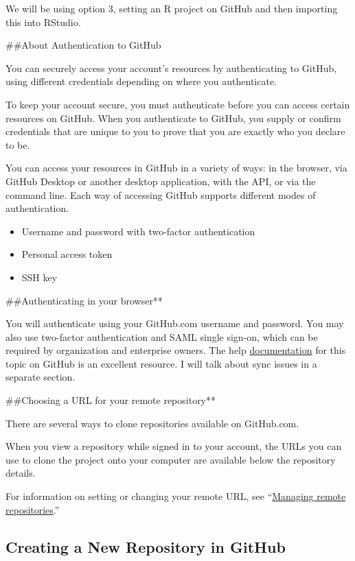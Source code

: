\documentclass[
]{article}
\begin{document}
We will be using option 3, setting an R project on GitHub and then
importing this into RStudio.

\#\#About Authentication to GitHub

You can securely access your account's resources by authenticating to
GitHub, using different credentials depending on where you authenticate.

To keep your account secure, you must authenticate before you can access
certain resources on GitHub. When you authenticate to GitHub, you supply
or confirm credentials that are unique to you to prove that you are
exactly who you declare to be.

You can access your resources in GitHub in a variety of ways: in the
browser, via GitHub Desktop or another desktop application, with the
API, or via the command line. Each way of accessing GitHub supports
different modes of authentication.

\begin{itemize}
\item
  Username and password with two-factor authentication
\item
  Personal access token
\item
  SSH key
\end{itemize}

\#\#Authenticating in your browser**

You will authenticate using your GitHub.com username and password. You
may also use two-factor authentication and SAML single sign-on, which
can be required by organization and enterprise owners. The help
\href{https://docs.github.com/en/authentication/keeping-your-account-and-data-secure/about-authentication-to-github}{documentation}
for this topic on GitHub is an excellent resource. I will talk about
sync issues in a separate section.

\#\#Choosing a URL for your remote repository**

There are several ways to clone repositories available on GitHub.com.

When you view a repository while signed in to your account, the URLs you
can use to clone the project onto your computer are available below the
repository details.

For information on setting or changing your remote URL, see
``\href{https://docs.github.com/en/github/getting-started-with-github/managing-remote-repositories}{Managing
remote repositories}.''

\hypertarget{creating-a-new-repository-in-github}{%
\subsection{Creating a New Repository in
GitHub}\label{creating-a-new-repository-in-github}}
\end{document}
